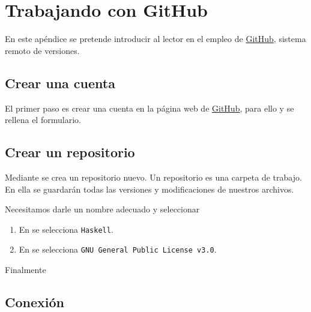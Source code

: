 \appendix

\chapter{Trabajando con GitHub}

En este apéndice se pretende introducir al lector en el empleo de
\href{https://github.com/}{GitHub}, sistema remoto de versiones.

\section{Crear una cuenta}

El primer paso es crear una cuenta en la página web de
\href{https://github.com/}{GitHub}, para ello  y se
rellena el formulario.

\section{Crear un repositorio}

Mediante  se crea un repositorio nuevo.  Un
repositorio es una carpeta de trabajo. En ella se guardarán todas las versiones
y modificaciones de nuestros archivos.

Necesitamos darle un nombre adecuado y seleccionar
\begin{enumerate}
\item En  se selecciona \texttt{Haskell}.
\item En  se selecciona \texttt{GNU General Public License v3.0}.
\end{enumerate}

Finalmente 

\section{Conexión}

